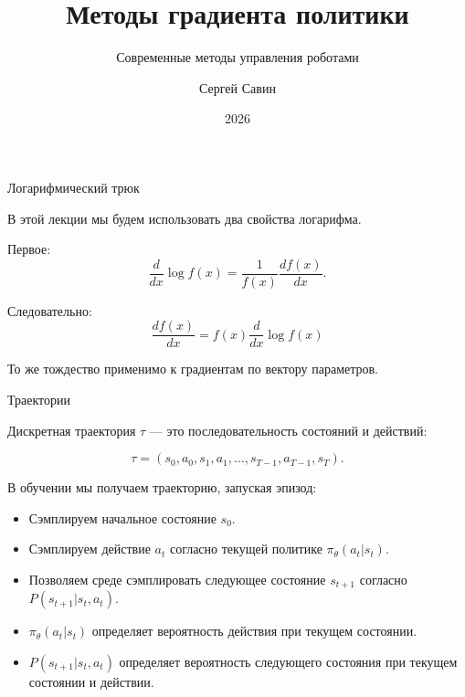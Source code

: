 \documentclass{beamer}
\subtitle{Современные методы управления роботами}
\author{Сергей Савин}
\date{2026}
\title{Методы градиента политики}
\begin{document}
	\maketitle
	
	\begin{frame}{Логарифмический трюк}
		\begin{flushleft}
			
			В этой лекции мы будем использовать два свойства логарифма.
			
			Первое:
			\[
			\frac{d}{dx}\log f(x)
			=
			\frac{1}{f(x)}\frac{df(x)}{dx}.
			\]
			
			Следовательно:
			\[
			\boxed{
				\frac{df(x)}{dx}
				=
				f(x)\frac{d}{dx}\log f(x)
			}
			\]
			
			То же тождество применимо к градиентам по
			вектору параметров.
			
		\end{flushleft}
	\end{frame}
	
	\begin{frame}{Траектории}
		\begin{flushleft}
			
			Дискретная траектория $\tau$ — это последовательность состояний
			и действий:
			
			\[
			\tau=(s_0,a_0,s_1,a_1,\ldots,s_{T-1},a_{T-1},s_T).
			\]
			
			В обучении мы получаем траекторию, запуская эпизод:
			
			\begin{itemize}
				\item Сэмплируем начальное состояние $s_0$.
				\item Сэмплируем действие $a_t$ согласно
				текущей политике $\pi_\theta(a_t|s_t)$.
				\item Позволяем среде сэмплировать следующее состояние
				$s_{t+1}$ согласно
				$P(s_{t+1}|s_t,a_t)$.
			\end{itemize}
			
			\vspace{0.2cm}
			
			\begin{itemize}
				\item $\pi_\theta(a_t|s_t)$ определяет вероятность
				действия при текущем состоянии.
				\item $P(s_{t+1}|s_t,a_t)$ определяет вероятность
				следующего состояния при текущем состоянии и действии.
			\end{itemize}
			
		\end{flushleft}
	\end{frame}
	
\end{document}
